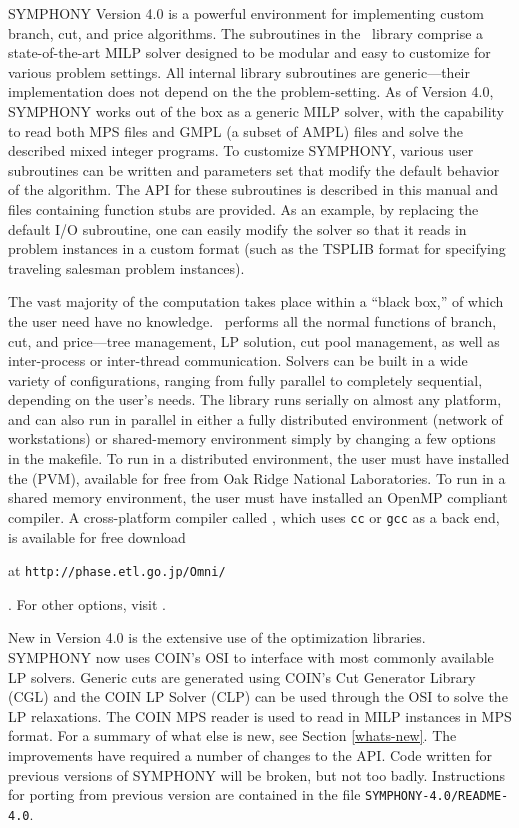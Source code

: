 SYMPHONY Version 4.0 is a powerful environment for implementing custom branch,
cut, and price algorithms. The subroutines in the \BB\ library comprise a
state-of-the-art MILP solver designed to be modular and easy to customize for
various problem settings. All internal library subroutines are generic---their
implementation does not depend on the the problem-setting. As of Version 4.0,
SYMPHONY works out of the box as a generic MILP solver, with the capability to
read both MPS files and GMPL (a subset of AMPL) files and solve the described
mixed integer programs. To customize SYMPHONY, various user subroutines can be
written and parameters set that modify the default behavior of the
algorithm. The API for these subroutines is described in this manual and files
containing function stubs are provided. As an example, by replacing the
default I/O subroutine, one can easily modify the solver so that it reads in
problem instances in a custom format (such as the TSPLIB format for specifying
traveling salesman problem instances).

The vast majority of the computation takes place within a ``black box,'' of
which the user need have no knowledge. \BB\ performs all the normal functions
of branch, cut, and price---tree management, LP solution, cut pool management,
as well as inter-process or inter-thread communication. Solvers can be built
in a wide variety of configurations, ranging from fully parallel to completely
sequential, depending on the user's needs. The library runs serially on almost
any platform, and can also run in parallel in either a fully distributed
environment (network of workstations) or shared-memory environment simply by
changing a few options in the makefile. To run in a distributed environment,
the user must have installed the {\em
{}}
(PVM), available for free from Oak Ridge National Laboratories.
To run in a shared memory environment, the user must have installed an
OpenMP compliant compiler. A cross-platform compiler called {\em
{}}, which uses 
{\tt cc} or {\tt gcc} as a back end, is available for free download
\begin{latexonly}
at {\tt http://phase.etl.go.jp/Omni/}
\end{latexonly}. For other options, visit
\texttt{}.

New in Version 4.0 is the extensive use of the
 optimization libraries.
SYMPHONY now uses COIN's OSI to interface with most commonly available LP
solvers. Generic cuts are generated using COIN's Cut Generator Library
(CGL) and the COIN LP Solver (CLP) can be used through the OSI to solve the LP
relaxations. The COIN MPS reader is used to read in MILP instances in MPS
format. For a summary of what else is new, see Section \ref{whats-new}. The
improvements have required a number of changes to the API. Code written for
previous versions of SYMPHONY will be broken, but not too badly. Instructions
for porting from previous version are contained in the file
\texttt{SYMPHONY-4.0/README-4.0}.

